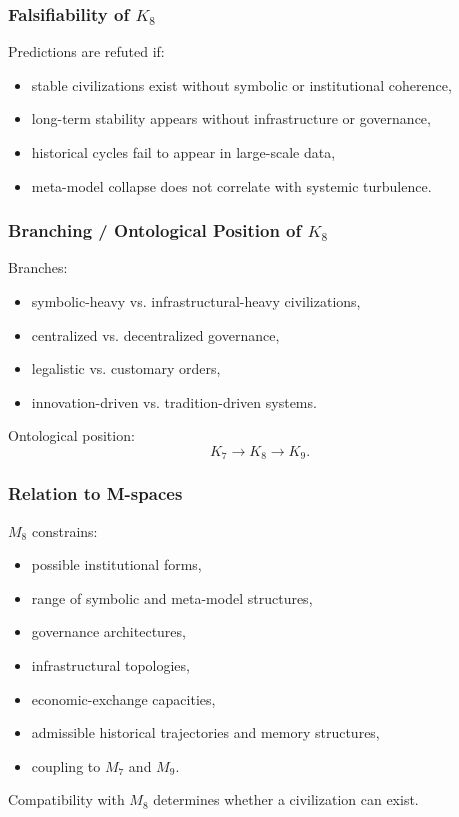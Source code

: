 \subsubsection{Falsifiability of \texorpdfstring{$K_8$}{K_8}}

Predictions are refuted if:
\begin{itemize}
    \item stable civilizations exist without symbolic or institutional coherence,
    \item long-term stability appears without infrastructure or governance,
    \item historical cycles fail to appear in large-scale data,
    \item meta-model collapse does not correlate with systemic turbulence.
\end{itemize}

\subsubsection{Branching / Ontological Position of \texorpdfstring{$K_8$}{K_8}}

Branches:
\begin{itemize}
    \item symbolic-heavy vs. infrastructural-heavy civilizations,
    \item centralized vs. decentralized governance,
    \item legalistic vs. customary orders,
    \item innovation-driven vs. tradition-driven systems.
\end{itemize}

Ontological position:
\[
K_7 \to K_8 \to K_9.
\]

\subsubsection{Relation to M-spaces}

$M_8$ constrains:
\begin{itemize}
    \item possible institutional forms,
    \item range of symbolic and meta-model structures,
    \item governance architectures,
    \item infrastructural topologies,
    \item economic-exchange capacities,
    \item admissible historical trajectories and memory structures,
    \item coupling to $M_7$ and $M_9$.
\end{itemize}

Compatibility with $M_8$ determines whether a civilization can exist.
